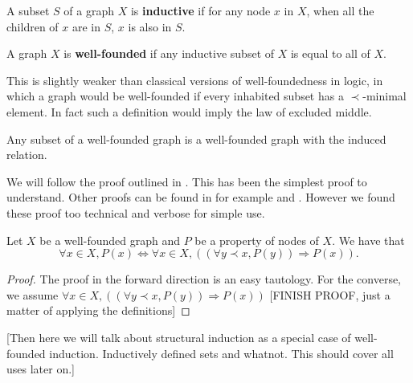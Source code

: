 \begin{defin}
    A subset $S$ of a graph $X$ is \textbf{inductive} if for any node $x$ in $X$, when all the children of $x$ are in $S$, $x$ is also in $S$.
\end{defin}

\begin{defin}
    A graph $X$ is \textbf{well-founded} if any inductive subset of $X$ is equal to all of $X$.
\end{defin}

\begin{remark}
    This is slightly weaker than classical versions of well-foundedness in logic, in which a graph would be well-founded if every inhabited subset has a $\prec$-minimal element. In fact such a definition would imply the law of excluded middle.
\end{remark}

\begin{lemma}\label{sswfg}
    Any subset of a well-founded graph is a well-founded graph with the induced relation.
\end{lemma}

We will follow the proof outlined in \cite{winskel1993formal}. This has been the simplest proof to understand. Other proofs can be found in for example \cite{johnstone1987notes} and \cite[Chapter 7]{barwise1982handbook}. However we found these proof too technical and verbose for simple use.

\begin{theorem}
    Let $X$ be a well-founded graph and $P$ be a property of nodes of $X$.
    We have that $$\forall x \in X, P(x) \Leftrightarrow \forall x \in X,((\forall y \prec x, P(y)) \Rightarrow P(x)).$$
\end{theorem}

\begin{proof}
    The proof in the forward direction is an easy tautology. For the converse, we assume  $ \forall x \in X,((\forall y \prec x, P(y)) \Rightarrow P(x))$ [FINISH PROOF, just a matter of applying the definitions]
\end{proof}

[Then here we will talk about structural induction as a special case of well-founded induction. Inductively defined sets and whatnot. This should cover all uses later on.]
